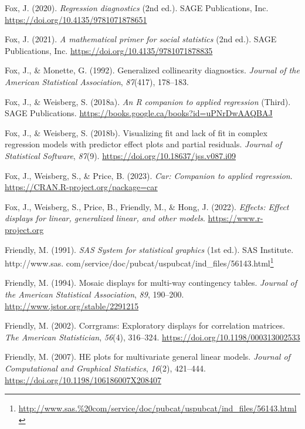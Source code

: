 \documentclass[
  letterpaper,
  10pt,
  krantz2]{krantz}
\newlength{\cslhangindent}
\newenvironment{CSLReferences}[2] %
 {\begin{list}{}{%
  \setlength{\itemindent}{0pt}
  \setlength{\leftmargin}{0pt}
  \setlength{\parsep}{0pt}
  \ifodd #1
   \setlength{\leftmargin}{\cslhangindent}
   \setlength{\itemindent}{-1\cslhangindent}
  \fi
  \setlength{\itemsep}{#2\baselineskip}}}
 {\end{list}}
\providecommand{\href}[2]{#2\footnote{\url{#1}}}
\begin{document}
\begin{CSLReferences}{1}{0}
Fox, J. (2020). \emph{Regression diagnostics} (2nd ed.). {SAGE}
Publications, Inc. \url{https://doi.org/10.4135/9781071878651}

Fox, J. (2021). \emph{A mathematical primer for social statistics} (2nd
ed.). SAGE Publications, Inc.
\url{https://doi.org/10.4135/9781071878835}

Fox, J., \& Monette, G. (1992). Generalized collinearity diagnostics.
\emph{Journal of the American Statistical Association}, \emph{87}(417),
178--183.

Fox, J., \& Weisberg, S. (2018a). \emph{An {R} companion to applied
regression} (Third). SAGE Publications.
\url{https://books.google.ca/books?id=uPNrDwAAQBAJ}

Fox, J., \& Weisberg, S. (2018b). Visualizing fit and lack of fit in
complex regression models with predictor effect plots and partial
residuals. \emph{Journal of Statistical Software}, \emph{87}(9).
\url{https://doi.org/10.18637/jss.v087.i09}

Fox, J., Weisberg, S., \& Price, B. (2023). \emph{Car: Companion to
applied regression}. \url{https://CRAN.R-project.org/package=car}

Fox, J., Weisberg, S., Price, B., Friendly, M., \& Hong, J. (2022).
\emph{Effects: Effect displays for linear, generalized linear, and other
models}. \url{https://www.r-project.org}

Friendly, M. (1991). \emph{{SAS System} for statistical graphics} (1st
ed.). SAS Institute.
\href{http://www.sas.\%20com/service/doc/pubcat/uspubcat/ind_files/56143.html}{http://www.sas.
com/service/doc/pubcat/uspubcat/ind\_files/56143.html}

Friendly, M. (1994). Mosaic displays for multi-way contingency tables.
\emph{Journal of the American Statistical Association}, \emph{89},
190--200. \url{http://www.jstor.org/stable/2291215}

Friendly, M. (2002). Corrgrams: Exploratory displays for correlation
matrices. \emph{The American Statistician}, \emph{56}(4), 316--324.
\url{https://doi.org/10.1198/000313002533}

Friendly, M. (2007). {HE} plots for multivariate general linear models.
\emph{Journal of Computational and Graphical Statistics}, \emph{16}(2),
421--444. \url{https://doi.org/10.1198/106186007X208407}


\end{CSLReferences}
\end{document}
